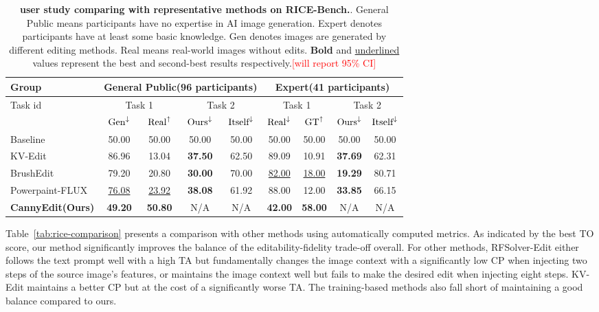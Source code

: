 \documentclass{article}
\begin{document}
\begin{table}[t]
\begin{center} 
\footnotesize
\setlength{\tabcolsep}{1.85mm} %
\caption{\textbf{user study comparing with representative methods on RICE-Bench.}.  General Public means participants have no expertise in AI image generation. Expert denotes participants have at least some basic knowledge. Gen denotes images are generated by different editing methods. Real means real-world images without edits. \textbf{Bold} and \underline{underlined} values represent the best and second-best results respectively.\textcolor{red}{[will report 95\% CI]}}
\begin{tabular}{l|cc|cc|cc|cc}
\toprule
\multirow{2}{*}[0.8ex]{Group} & \multicolumn{4}{c|}{General Public(96 participants)} & \multicolumn{4}{c}{Expert(41 participants)} \\
\midrule
\multirow{2}{*}[0.8ex]{Task id} & \multicolumn{2}{c|}{Task 1} & \multicolumn{2}{c|}{Task 2} &\multicolumn{2}{c|}{Task 1} & \multicolumn{2}{c}{Task 2}\\
\midrule
 Ratio regarded as AI(\%) & $\textup{Gen}^{\downarrow}$ & $\textup{Real}^{\uparrow}$ & $\textup{Ours}^{\downarrow}$ & $\textup{Itself}^{\downarrow}$ & $\textup{Real}^{\downarrow}$ & $\textup{GT}^{\uparrow}$ & $\textup{Ours}^{\downarrow}$ & $\textup{Itself}^{\downarrow}$\\
\midrule
Baseline & 50.00  & 50.00 & 50.00 & 50.00 & 50.00 & 50.00 & 50.00 & 50.00\\
\midrule
KV-Edit~\cite{zhu2025kv} & 86.96  & 13.04 & \textbf{37.50} & 62.50 & 89.09 & 10.91 & \textbf{37.69} & 62.31\\
BrushEdit~\cite{li2024brushedit} & 79.20 & 20.80 & \textbf{30.00} & 70.00 & \underline{82.00} & \underline{18.00} & \textbf{19.29} & 80.71\\
Powerpaint-FLUX~\cite{zhuang2023task} & \underline{76.08} & \underline{23.92} & \textbf{38.08} & 61.92 & 88.00 & 12.00 & \textbf{33.85} & 66.15\\
\midrule
\textbf{CannyEdit(Ours)} & \textbf{49.20} & \textbf{50.80} & N/A & N/A & \textbf{42.00} & \textbf{58.00} & N/A & N/A\\
\bottomrule
\end{tabular}
\label{tab:rice-human-study} 
\end{center}
\end{table}


Table~\ref{tab:rice-comparison} presents a comparison with other methods using automatically computed metrics. As indicated by the best TO score, our method significantly improves the balance of the editability-fidelity trade-off overall. For other methods, RFSolver-Edit either follows the text prompt well with a high TA but fundamentally changes the image context with a significantly low CP when injecting two steps of the source image's features, or maintains the image context well but fails to make the desired edit when injecting eight steps. KV-Edit maintains a better CP but at the cost of a significantly worse TA. The training-based methods also fall short of maintaining a good balance compared to ours.
\end{document}

